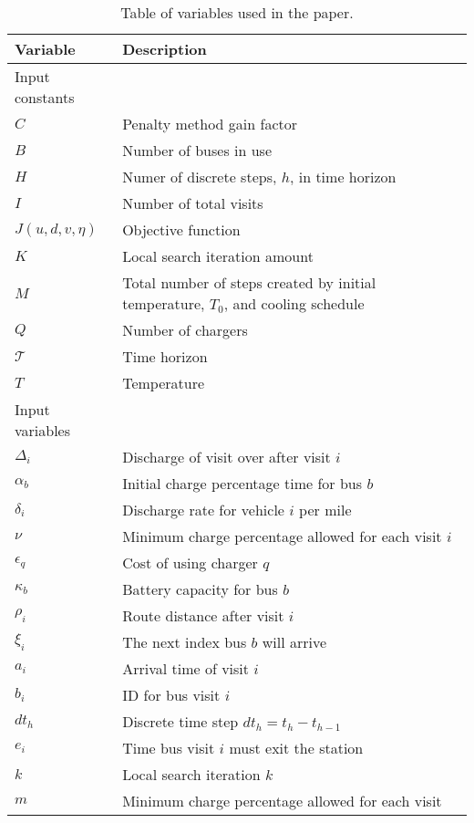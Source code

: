 \documentclass[11pt,a4paper,final]{article}
\newcommand{\T}{\mathcal{T}}                %
\newcommand{\Tau}{T}                        %
\begin{document}
\begin{table}[htbp]
\caption{\label{tab:variables}Table of variables used in the paper.}
\centering
\begin{tabular}{ll}
\textbf{Variable} & \textbf{Description}\\[0pt]
\hline
Input constants & \\[0pt]
\(C\) & Penalty method gain factor\\[0pt]
\(B\) & Number of buses in use\\[0pt]
\(H\) & Numer of discrete steps, \(h\), in time horizon\\[0pt]
\(I\) & Number of total visits\\[0pt]
\(J(u,d,v,\eta)\) & Objective function\\[0pt]
\(K\) & Local search iteration amount\\[0pt]
\(M\) & Total number of steps created by initial temperature, \(\Tau_0\), and cooling schedule\\[0pt]
\(Q\) & Number of chargers\\[0pt]
\(\T\) & Time horizon\\[0pt]
\(\Tau\) & Temperature\\[0pt]
\hline
Input variables & \\[0pt]
\(\Delta_i\) & Discharge of visit over after visit \(i\)\\[0pt]
\(\alpha_b\) & Initial charge percentage time for bus \(b\)\\[0pt]
\(\delta_i\) & Discharge rate for vehicle \(i\) per mile\\[0pt]
\(\nu\) & Minimum charge percentage allowed for each visit \(i\)\\[0pt]
\(\epsilon_q\) & Cost of using charger \(q\)\\[0pt]
\(\kappa_b\) & Battery capacity for bus \(b\)\\[0pt]
\(\rho_i\) & Route distance after visit \(i\)\\[0pt]
\(\xi_i\) & The next index bus \(b\) will arrive\\[0pt]
\(a_i\) & Arrival time of visit \(i\)\\[0pt]
\(b_i\) & ID for bus visit \(i\)\\[0pt]
\(dt_h\) & Discrete time step \(dt_h = t_h - t_{h-1}\)\\[0pt]
\(e_i\) & Time bus visit \(i\) must exit the station\\[0pt]
\(k\) & Local search iteration \(k\)\\[0pt]
\(m\) & Minimum charge percentage allowed for each visit\\[0pt]

\end{tabular}
\end{table}
\end{document}
